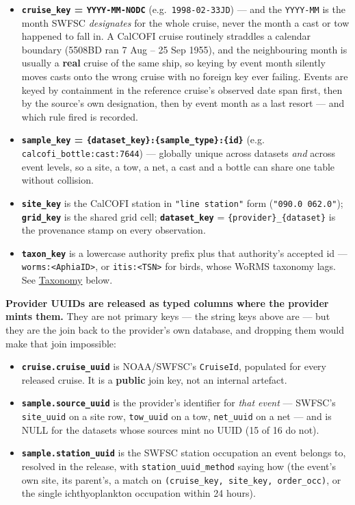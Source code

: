 \documentclass[
  letterpaper,
  DIV=11,
  numbers=noendperiod]{scrreprt}
\providecommand{\tightlist}{%
  \setlength{\itemsep}{0pt}\setlength{\parskip}{0pt}}
\begin{document}
\begin{itemize}
\tightlist
\item
  \textbf{\texttt{cruise\_key} = \texttt{YYYY-MM-NODC}}
  (e.g.~\texttt{1998-02-33JD}) --- and the \texttt{YYYY-MM} is the month
  SWFSC \emph{designates} for the whole cruise, never the month a cast
  or tow happened to fall in. A CalCOFI cruise routinely straddles a
  calendar boundary (5508BD ran 7 Aug -- 25 Sep 1955), and the
  neighbouring month is usually a \textbf{real} cruise of the same ship,
  so keying by event month silently moves casts onto the wrong cruise
  with no foreign key ever failing. Events are keyed by containment in
  the reference cruise's observed date span first, then by the source's
  own designation, then by event month as a last resort --- and which
  rule fired is recorded.
\item
  \textbf{\texttt{sample\_key} =
  \texttt{\{dataset\_key\}:\{sample\_type\}:\{id\}}} (e.g.
  \texttt{calcofi\_bottle:cast:7644}) --- globally unique across
  datasets \emph{and} across event levels, so a site, a tow, a net, a
  cast and a bottle can share one table without collision.
\item
  \textbf{\texttt{site\_key}} is the CalCOFI station in
  \texttt{"line\ station"} form (\texttt{"090.0\ 062.0"});
  \textbf{\texttt{grid\_key}} is the shared grid cell;
  \textbf{\texttt{dataset\_key}} = \texttt{\{provider\}\_\{dataset\}} is
  the provenance stamp on every observation.
\item
  \textbf{\texttt{taxon\_key}} is a lowercase authority prefix plus that
  authority's accepted id ---
  \texttt{worms:\textless{}AphiaID\textgreater{}}, or
  \texttt{itis:\textless{}TSN\textgreater{}} for birds, whose WoRMS
  taxonomy lags. See \hyperref[taxonomy]{Taxonomy} below.
\end{itemize}

\textbf{Provider UUIDs are released as typed columns where the provider
mints them.} They are not primary keys --- the string keys above are ---
but they are the join back to the provider's own database, and dropping
them would make that join impossible:

\begin{itemize}
\tightlist
\item
  \textbf{\texttt{cruise.cruise\_uuid}} is NOAA/SWFSC's
  \texttt{CruiseId}, populated for every released cruise. It is a
  \textbf{public} join key, not an internal artefact.
\item
  \textbf{\texttt{sample.source\_uuid}} is the provider's identifier for
  \emph{that event} --- SWFSC's \texttt{site\_uuid} on a site row,
  \texttt{tow\_uuid} on a tow, \texttt{net\_uuid} on a net --- and is
  NULL for the datasets whose sources mint no UUID (15 of 16 do not).
\item
  \textbf{\texttt{sample.station\_uuid}} is the SWFSC station occupation
  an event belongs to, resolved in the release, with
  \texttt{station\_uuid\_method} saying how (the event's own site, its
  parent's, a match on \texttt{(cruise\_key,\ site\_key,\ order\_occ)},
  or the single ichthyoplankton occupation within 24 hours).
\end{itemize}
\end{document}
